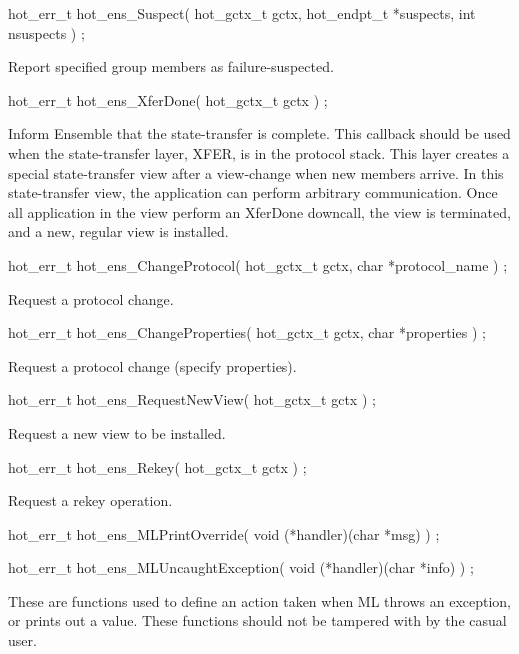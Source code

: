 \begin{codebox}
hot_err_t hot_ens_Suspect(
   hot_gctx_t gctx,
   hot_endpt_t *suspects, 
   int nsuspects
) ;
\end{codebox}
Report specified group members as failure-suspected.

\begin{codebox}
hot_err_t hot_ens_XferDone(
   hot_gctx_t gctx
) ;
\end{codebox}
Inform Ensemble that the state-transfer is complete. 
This callback should be used when the state-transfer layer,
XFER, is in the protocol stack. This layer creates a special
state-transfer view after a view-change when new members arrive. 
In this state-transfer view, the application can perform arbitrary 
communication. Once all application in the view perform an XferDone
downcall, the view is terminated, and a new, regular view is
installed. 

\begin{codebox}
hot_err_t hot_ens_ChangeProtocol(
  hot_gctx_t gctx,
  char *protocol_name
) ;
\end{codebox}
Request a protocol change.

\begin{codebox}
hot_err_t hot_ens_ChangeProperties(
  hot_gctx_t gctx, 
  char *properties
) ;
\end{codebox}
Request a protocol change (specify properties).

\begin{codebox}
hot_err_t hot_ens_RequestNewView(
  hot_gctx_t gctx
) ;
\end{codebox}
Request a new view to be installed.

\begin{codebox}
hot_err_t hot_ens_Rekey(
  hot_gctx_t gctx
) ;
\end{codebox}
Request a rekey operation. 

\begin{codebox}
hot_err_t hot_ens_MLPrintOverride(
  void (*handler)(char *msg)
) ;

hot_err_t hot_ens_MLUncaughtException(
  void (*handler)(char *info)
) ;
\end{codebox}
These are functions used to define an action taken when ML throws an
exception, or prints out a value. These functions should not be
tampered with by the casual user. 

